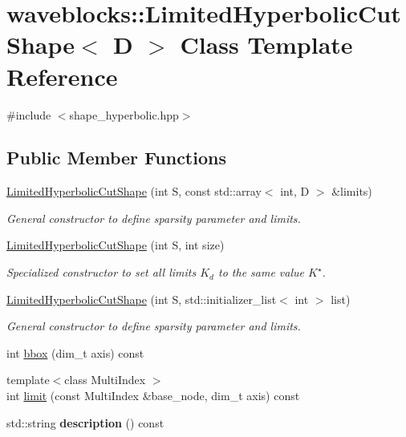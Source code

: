 \hypertarget{classwaveblocks_1_1_limited_hyperbolic_cut_shape}{}\section{waveblocks\+:\+:Limited\+Hyperbolic\+Cut\+Shape$<$ D $>$ Class Template Reference}
\label{classwaveblocks_1_1_limited_hyperbolic_cut_shape}


{\ttfamily \#include $<$shape\+\_\+hyperbolic.\+hpp$>$}

\subsection*{Public Member Functions}
\begin{DoxyCompactItemize}
\item 
\hyperlink{classwaveblocks_1_1_limited_hyperbolic_cut_shape_a7e465bada711731a921b158d3222fa83}{Limited\+Hyperbolic\+Cut\+Shape} (int S, const std\+::array$<$ int, D $>$ \&limits)
\begin{DoxyCompactList}\small\item\em General constructor to define sparsity parameter and limits. \end{DoxyCompactList}\item 
\hyperlink{classwaveblocks_1_1_limited_hyperbolic_cut_shape_aec560dd3f0320fcd47df5ccc8f361f94}{Limited\+Hyperbolic\+Cut\+Shape} (int S, int size)
\begin{DoxyCompactList}\small\item\em Specialized constructor to set all limits $ K_d $ to the same value $ K^\star $. \end{DoxyCompactList}\item 
\hyperlink{classwaveblocks_1_1_limited_hyperbolic_cut_shape_affbff3fcfc3714f82d2e85261237f5a6}{Limited\+Hyperbolic\+Cut\+Shape} (int S, std\+::initializer\+\_\+list$<$ int $>$ list)
\begin{DoxyCompactList}\small\item\em General constructor to define sparsity parameter and limits. \end{DoxyCompactList}\item 
int \hyperlink{classwaveblocks_1_1_limited_hyperbolic_cut_shape_a0be64cd821d747288934130e5a43d2f6}{bbox} (dim\+\_\+t axis) const 
\item 
{\footnotesize template$<$class Multi\+Index $>$ }\\int \hyperlink{classwaveblocks_1_1_limited_hyperbolic_cut_shape_a3ecd60f8af667f143ce4798674ccb7f9}{limit} (const Multi\+Index \&base\+\_\+node, dim\+\_\+t axis) const 
\item 
\hypertarget{classwaveblocks_1_1_limited_hyperbolic_cut_shape_af1162aedf0ae6d18607fe4a783cb251f}{}std\+::string {\bfseries description} () const \label{classwaveblocks_1_1_limited_hyperbolic_cut_shape_af1162aedf0ae6d18607fe4a783cb251f}

\end{DoxyCompactItemize}



